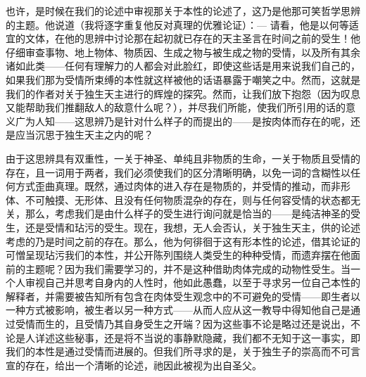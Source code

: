 也许，是时候在我们的论述中审视那关于本性的论述了，这乃是他那可笑哲学思辨的主题。他说道（我将逐字重复他反对真理的优雅论证）：— \newline{}请看，他是以何等适宜的文体，在他的思辨中讨论那在起初就已存在的天主圣言在时间之前的受生！他仔细审查事物、地上物体、物质因、生成之物与被生成之物的受情，以及所有其余诸如此类——任何有理解力的人都会对此脸红，即使这些话是用来说我们自己的，如果我们那为受情所束缚的本性就这样被他的话语暴露于嘲笑之中。然而，这就是我们的作者对关于独生天主进行的辉煌的探究。然而，让我们放下抱怨（因为叹息又能帮助我们推翻敌人的敌意什么呢？），并尽我们所能，使我们所引用的话的意义广为人知——这思辨乃是针对什么样子的而提出的——是按肉体而存在的呢，还是应当沉思于独生天主之内的呢？\par

由于这思辨具有双重性，一关于神圣、单纯且非物质的生命，一关于物质且受情的存在，且一词用于两者，我们必须使我们的区分清晰明确，以免一词的含糊性以任何方式歪曲真理。既然，通过肉体的进入存在是物质的，并受情的推动，而非形体、不可触摸、无形体、且没有任何物质混杂的存在，则与任何容受情的状态都无关，那么，考虑我们是由什么样子的受生进行询问就是恰当的——是纯洁神圣的受生，还是受情和玷污的受生。\newline{}现在，我想，无人会否认，关于独生天主，供的论述考虑的乃是时间之前的存在。那么，他为何徘徊于这有形本性的论述，借其论证的可憎呈现玷污我们的本性，并公开陈列围绕人类受生的种种受情，而遗弃摆在他面前的主题呢？因为我们需要学习的，并不是这种借助肉体完成的动物性受生。当一个人审视自己并思考自身内的人性时，他如此愚蠢，以至于寻求另一位自己本性的解释者，并需要被告知所有包含在肉体受生观念中的不可避免的受情——即生者以一种方式被影响，被生者以另一种方式——从而人应从这一教导中得知他自己是通过受情而生的，且受情乃其自身受生之开端？因为这些事不论是略过还是说出，不论是人详述这些秘事，还是将不当说的事静默隐藏，我们都不无知于这一事实，即我们的本性是通过受情而进展的。但我们所寻求的是，关于独生子的崇高而不可言宣的存在，给出一个清晰的论述，祂因此被视为出自圣父。\par


